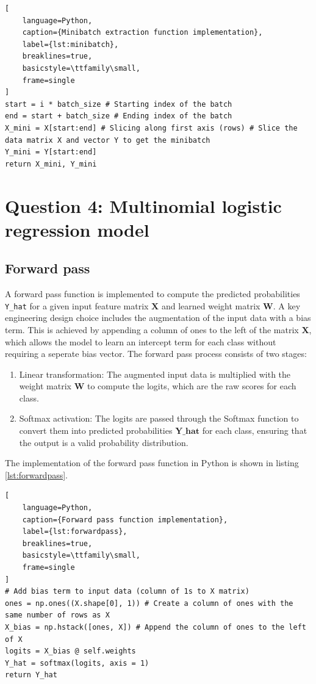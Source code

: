 \documentclass[11pt]{article}
\begin{document}
 \begin{lstlisting}[
    language=Python, 
    caption={Minibatch extraction function implementation},
    label={lst:minibatch},
    breaklines=true,
    basicstyle=\ttfamily\small,
    frame=single
]
start = i * batch_size # Starting index of the batch
end = start + batch_size # Ending index of the batch
X_mini = X[start:end] # Slicing along first axis (rows) # Slice the data matrix X and vector Y to get the minibatch
Y_mini = Y[start:end]
return X_mini, Y_mini
\end{lstlisting}

\section*{Question 4: Multinomial logistic regression model}
\subsection*{Forward pass}
A forward pass function is implemented to compute the predicted probabilities \texttt{Y\_hat} for a given input feature matrix $\mathbf{X}$ and learned weight matrix $\mathbf{W}$.
A key engineering design choice includes the augmentation of the input data with a bias term. This is achieved by appending a 
column of ones to the left of the matrix $\mathbf{X}$, which allows the model to learn an intercept term for each class without requiring a seperate bias vector.
The forward pass process consists of two stages:
\begin{enumerate}
    \item Linear transformation: The augmented input data is multiplied with the weight matrix $\mathbf{W}$ to compute the logits, which are the raw scores for each class.
    \item Softmax activation: The logits are passed through the Softmax function to convert them into predicted probabilities $\mathbf{Y\_hat}$ for each class, ensuring that the output is a valid probability distribution.
\end{enumerate}
The implementation of the forward pass function in Python is shown in listing \ref{lst:forwardpass}.
 \begin{lstlisting}[
    language=Python, 
    caption={Forward pass function implementation},
    label={lst:forwardpass},
    breaklines=true,
    basicstyle=\ttfamily\small,
    frame=single
]
# Add bias term to input data (column of 1s to X matrix)
ones = np.ones((X.shape[0], 1)) # Create a column of ones with the same number of rows as X
X_bias = np.hstack([ones, X]) # Append the column of ones to the left of X
logits = X_bias @ self.weights
Y_hat = softmax(logits, axis = 1)
return Y_hat
\end{lstlisting}
\end{document}
